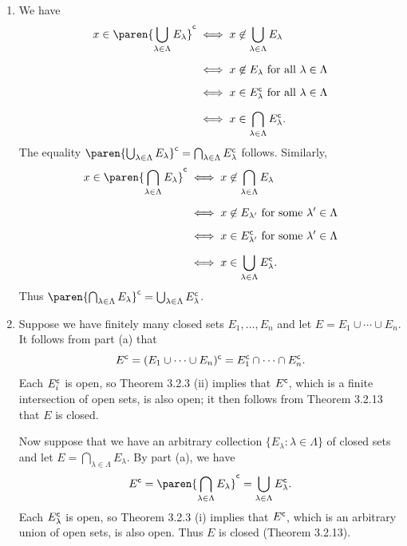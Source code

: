 \documentclass{lew98_solutions}
\begin{document}
\begin{solution}
    \begin{enumerate}
        \item We have
        \begin{align*}
            x \in \setcomp{\paren{ \bigcup_{\lambda \in \Lambda} E_{\lambda} }} &\iff x \not\in \bigcup_{\lambda \in \Lambda} E_{\lambda} \\[2mm]
            &\iff x \not\in E_{\lambda} \text{ for all } \lambda \in \Lambda \\[2mm]
            &\iff x \in \setcomp{E_{\lambda}} \text{ for all } \lambda \in \Lambda \\[2mm]
            &\iff x \in \bigcap_{\lambda \in \Lambda} \setcomp{E_{\lambda}}.
        \end{align*}
        The equality \( \setcomp{\paren{ \bigcup_{\lambda \in \Lambda} E_{\lambda} }} = \bigcap_{\lambda \in \Lambda} \setcomp{E_{\lambda}} \) follows. Similarly,
        \begin{align*}
            x \in \setcomp{\paren{ \bigcap_{\lambda \in \Lambda} E_{\lambda} }} &\iff x \not\in \bigcap_{\lambda \in \Lambda} E_{\lambda} \\[2mm]
            &\iff x \not\in E_{\lambda'} \text{ for some } \lambda' \in \Lambda \\[2mm]
            &\iff x \in \setcomp{E_{\lambda'}} \text{ for some } \lambda' \in \Lambda \\[2mm]
            &\iff x \in \bigcup_{\lambda \in \Lambda} \setcomp{E_{\lambda}}.
        \end{align*}
        Thus \( \setcomp{\paren{ \bigcap_{\lambda \in \Lambda} E_{\lambda} }} = \bigcup_{\lambda \in \Lambda} \setcomp{E_{\lambda}} \).

        \item Suppose we have finitely many closed sets \( E_1, \ldots, E_n \) and let \( E = E_1 \cup \cdots \cup E_n \). It follows from part (a) that
        \[
            E^{\mathsf{c}} = (E_1 \cup \cdots \cup E_n)^{\mathsf{c}} = E_1^{\mathsf{c}} \cap \cdots \cap E_n^{\mathsf{c}}.
        \]
        Each \( E_i^{\mathsf{c}} \) is open, so Theorem 3.2.3 (ii) implies that \( E^{\mathsf{c}} \), which is a finite intersection of open sets, is also open; it then follows from Theorem 3.2.13 that \( E \) is closed.
        
        Now suppose that we have an arbitrary collection \( \{ E_{\lambda} : \lambda \in \Lambda \} \) of closed sets and let \( E = \bigcap_{\lambda \in \Lambda} E_{\lambda} \). By part (a), we have
        \[
            \setcomp{E} = \setcomp{\paren{ \bigcap_{\lambda \in \Lambda} E_{\lambda} }} = \bigcup_{\lambda \in \Lambda} \setcomp{E_{\lambda}}.
        \]
        Each \( E_{\lambda}^{\mathsf{c}} \) is open, so Theorem 3.2.3 (i) implies that \( E^{\mathsf{c}} \), which is an arbitrary union of open sets, is also open. Thus \( E \) is closed (Theorem 3.2.13).
    \end{enumerate}
\end{solution}
\end{document}
